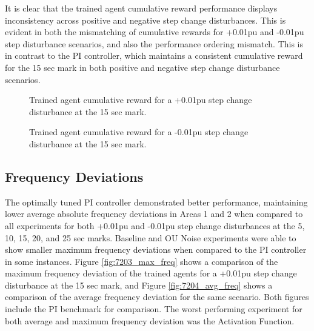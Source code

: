 It is clear that the trained agent cumulative reward performance displays inconsistency across positive and negative step change disturbances. This is evident in both the mismatching of cumulative rewards for +0.01pu and -0.01pu step disturbance scenarios, and also the performance ordering mismatch. This is in contrast to the PI controller, which maintains a consistent cumulative reward for the 15 sec mark in both positive and negative step change disturbance scenarios.
\begin{figure}[h]
	\begin{minipage}[t]{0.50\textwidth}
		\centering
		\resizebox{7cm}{!}{}
		\caption[Cumulative reward comparison for +0.01pu step change]{Trained agent cumulative reward for a +0.01pu step change disturbance at the 15 sec mark.}\label{fig:7201_cum_reward_pos}
	\end{minipage}
	\hspace{0.25cm}
	\begin{minipage}[t]{0.50\textwidth}
		\resizebox{7cm}{!}{}
		\caption[Cumulative reward comparison for +0.01pu step change]{Trained agent cumulative reward for a -0.01pu step change disturbance at the 15 sec mark.}\label{fig:7202_cum_reward_neg}
	\end{minipage}
\end{figure}

\subsection{Frequency Deviations}
The optimally tuned PI controller demonstrated better performance, maintaining lower average absolute frequency deviations in Areas 1 and 2 when compared to all experiments for both +0.01pu and -0.01pu step change disturbances at the 5, 10, 15, 20, and 25 sec marks. Baseline and OU Noise experiments were able to show smaller maximum frequency deviations when compared to the PI controller in some instances. Figure \ref{fig:7203_max_freq} shows a comparison of the maximum frequency deviation of  the trained agents for a +0.01pu step change disturbance at the 15 sec mark, and Figure \ref{fig:7204_avg_freq} shows a comparison of the average frequency deviation for the same scenario. Both figures include the PI benchmark for comparison. The worst performing experiment for both average and maximum frequency deviation was the Activation Function.

